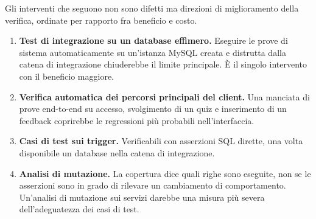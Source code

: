 Gli interventi che seguono non sono difetti ma direzioni di miglioramento
della verifica, ordinate per rapporto fra beneficio e costo.

\begin{enumerate}
  \item \textbf{Test di integrazione su un database effimero.} Eseguire le
    prove di sistema automaticamente su un'istanza MySQL creata e distrutta
    dalla catena di integrazione chiuderebbe il limite principale. È il
    singolo intervento con il beneficio maggiore.
  \item \textbf{Verifica automatica dei percorsi principali del client.} Una
    manciata di prove end-to-end su accesso, svolgimento di un quiz e
    inserimento di un feedback coprirebbe le regressioni più probabili
    nell'interfaccia.
  \item \textbf{Casi di test sui trigger.} Verificabili con asserzioni SQL
    dirette, una volta disponibile un database nella catena di integrazione.
  \item \textbf{Analisi di mutazione.} La copertura dice quali righe sono
    eseguite, non se le asserzioni sono in grado di rilevare un cambiamento
    di comportamento. Un'analisi di mutazione sui servizi darebbe una misura
    più severa dell'adeguatezza dei casi di test.
\end{enumerate}
